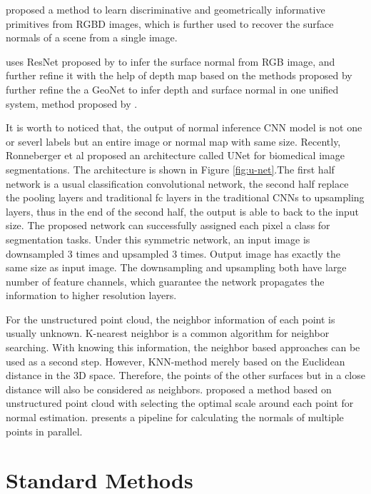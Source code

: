 \cite{geometry_based_solution} proposed a method to learn discriminative and geometrically informative primitives from RGBD images, which is further used to recover the surface normals of a scene from a single image. 

\cite{GeoNet} uses ResNet proposed by \cite{resnet} to infer the surface normal from RGB image, and further refine it with the help of depth map based on the methods proposed by \cite{geometry_based_solution}  further refine the a  GeoNet to infer depth and surface normal in one unified system,  method proposed by \cite{img2depth}. 

It is worth to noticed that, the output of normal inference CNN model is not one or severl labels but an entire image or normal map with same size. 
Recently, Ronneberger et al proposed an architecture called UNet \cite{unet} for biomedical image segmentations. The architecture is shown in Figure \ref{fig:u-net}.The first half network is a usual classification convolutional network, the second half replace the pooling layers and traditional fc layers in the traditional CNNs to upsampling layers, thus in the end of the second half, the output is able to back to the input size. The proposed network can successfully assigned each pixel a class for segmentation tasks. Under this symmetric network, an input image is downsampled 3 times and upsampled 3 times. Output image has exactly the same size as input image. The downsampling and upsampling both have large number of feature channels, which guarantee the network propagates the information to higher resolution layers.





For the unstructured point cloud, the neighbor information of each point is usually unknown. K-nearest neighbor is a common algorithm for neighbor searching. With knowing this information, the neighbor based approaches can be used as a second step. However, KNN-method merely based on the Euclidean distance in the 3D space. Therefore, the points of the other surfaces but in a close distance will also be considered as neighbors. \cite{unstructed-pc} proposed a method based on unstructured point cloud with selecting the optimal scale around each point for normal estimation. \cite{unstructed-pc-patch-stitching} presents a pipeline for calculating the normals of multiple points in parallel. 



\section{Standard Methods}

